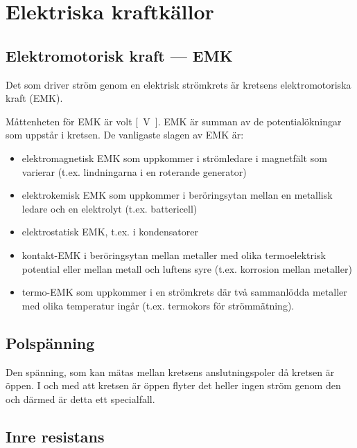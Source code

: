 \section{Elektriska kraftkällor}

\subsection{Elektromotorisk kraft --- EMK}

Det som driver ström genom en elektrisk strömkrets är kretsens elektromotoriska
kraft (EMK).

Måttenheten för EMK är \unit{volt} \unit{[V]}. EMK är summan av de
potentialökningar som uppstår i kretsen. De vanligaste slagen av EMK är:

\begin{itemize}
\item elektromagnetisk EMK som uppkommer i strömledare i magnetfält som
varierar (t.ex. lindningarna i en roterande generator)
\item elektrokemisk EMK som uppkommer i beröringsytan mellan en metallisk
ledare och en elektrolyt (t.ex. battericell)
\item elektrostatisk EMK, t.ex. i kondensatorer
\item kontakt-EMK i beröringsytan mellan metaller med olika termoelektrisk
potential eller mellan metall och luftens syre (t.ex. korrosion mellan metaller)
\item termo-EMK som uppkommer i en strömkrets där två sammanlödda metaller med
olika temperatur ingår (t.ex. termokors för strömmätning).
\end{itemize}

\subsection{Polspänning}

Den spänning, som kan mätas mellan kretsens anslutningspoler då kretsen är öppen. 
I och med att kretsen är öppen flyter det heller ingen ström genom den och därmed 
är detta ett specialfall.

\subsection{Inre resistans}

